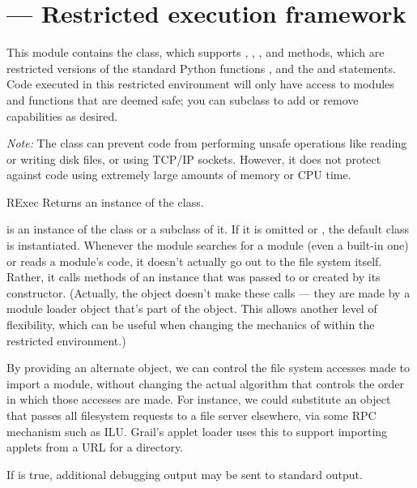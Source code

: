 \section{ ---
         Restricted execution framework}




This module contains the  class, which supports
, , , and
 methods, which are restricted versions of the standard
Python functions ,  and
the  and  statements.
Code executed in this restricted environment will
only have access to modules and functions that are deemed safe; you
can subclass  to add or remove capabilities as desired.

\emph{Note:} The  class can prevent code from performing
unsafe operations like reading or writing disk files, or using TCP/IP
sockets.  However, it does not protect against code using extremely
large amounts of memory or CPU time.  

\begin{classdesc}{RExec}{}
Returns an instance of the  class.  

 is an instance of the  class or a subclass of it.
If it is omitted or , the default  class is
instantiated.
Whenever the  module searches for a module (even a
built-in one) or reads a module's code, it doesn't actually go out to
the file system itself.  Rather, it calls methods of an 
instance that was passed to or created by its constructor.  (Actually,
the  object doesn't make these calls --- they are made by
a module loader object that's part of the  object.  This
allows another level of flexibility, which can be useful when changing
the mechanics of  within the restricted environment.)

By providing an alternate  object, we can control the
file system accesses made to import a module, without changing the
actual algorithm that controls the order in which those accesses are
made.  For instance, we could substitute an  object that
passes all filesystem requests to a file server elsewhere, via some
RPC mechanism such as ILU.  Grail's applet loader uses this to support
importing applets from a URL for a directory.

If  is true, additional debugging output may be sent to
standard output.
\end{classdesc}

